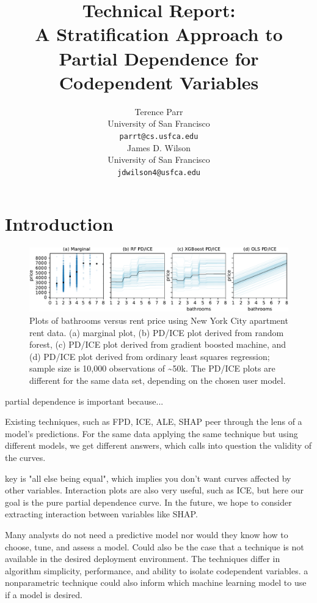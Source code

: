 \documentclass{article}
\title{Technical Report:\\
A Stratification Approach to Partial Dependence for Codependent Variables}
\author{%
  Terence Parr \\
  University of San Francisco\\
  \texttt{parrt@cs.usfca.edu} \\
  \And
  James D. Wilson \\
  University of San Francisco\\
  \texttt{jdwilson4@usfca.edu} \\
}
\begin{document}
\maketitle

\begin{abstract}
\end{abstract}

\section{Introduction}

\begin{figure}[htbp]
\begin{center}
\includegraphics[scale=0.5]{images/bathrooms_vs_price.pdf}
\caption{\footnotesize Plots of bathrooms versus rent price using New York City apartment rent data. (a) marginal plot, (b) PD/ICE plot derived from random forest, (c) PD/ICE plot derived from gradient boosted machine, and (d) PD/ICE plot derived from ordinary least squares regression; sample size is 10,000 observations of \textasciitilde50k. The PD/ICE plots are  different for the same data set, depending on the chosen user model.}
\label{fig:baths_price}
\end{center}
\end{figure}

partial dependence is important because...

Existing techniques, such as FPD, ICE, ALE, SHAP peer through the lens of a model's predictions. For the same data applying the same technique but using different models, we get different answers, which calls into question the validity of the curves.

key is "all else being equal", which implies you don't want curves affected by other variables. Interaction plots are also very useful, such as ICE, but here our goal is the pure partial dependence curve. In the future, we hope to consider extracting interaction between variables like SHAP.

Many analysts do not need a predictive model nor would they know how to choose, tune, and assess a model. Could also be the case that a technique is not available in the desired deployment environment.  The techniques differ in algorithm simplicity, performance, and ability to isolate codependent variables. a nonparametric technique could also inform which machine learning model to use if a model is desired.
\end{document}
